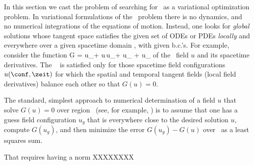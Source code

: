 



In this section we cast the problem of searching for \twots\ as a
variational optimization problem.
In variational formulations of the \spt\ problem there is no dynamics,
and no numerical integrations of the equations of motion. Instead, one
looks for {\em global} solutions whose tangent space
satisfies the given set of ODEs or PDEs {\em locally} and everywhere over
a given spacetime domain \R, with given b.c.'s. For example, consider the
function
\beq
    G = u_\zeit  + u\,u_\conf + u_{\conf \conf} + u_{\conf \conf \conf \conf}
of the \KS\ field $u$ and its spacetime derivatives. The \KSe\
 is satisfied only for those spacetime field configurations
$u(\conf,\zeit)$ for which the spatial and temporal tangent fields (local
field derivatives) balance each other so that $G(u)=0$.

The standard, simplest approach to numerical determination of a field $u$
that solve $G(u)=0$ over region \R\ (see, for example,
) is to assume that one has a guess field
configuration $u_g$ that is everywhere close to the desired solution $u$,
compute $G(u_g)$, and then minimize the error $G(u_g)-G(u)$ over \R\ as a
least squares sum.



That requires having a norm XXXXXXXX



